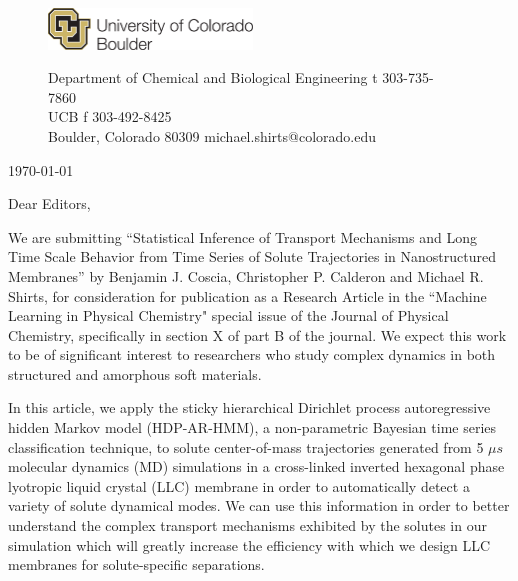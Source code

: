 \documentclass[fontsize=11pt]{article}
\begin{document}
	\graphicspath{{./figures/}}

	\begin{figure}
	\centering
	\begin{minipage}{0.37\textwidth}
	\includegraphics[width=2.14in,left]{CUBoulder.pdf}
	\end{minipage}
	\begin{minipage}{0.62\textwidth}
	\scriptsize
	\noindent Department of Chemical and Biological Engineering \hfill t 303-735-7860~~~~~~~~~~~~~~~~~~ \\
	 UCB \hfill f 303-492-8425~~~~~~~~~~~~~~~~~~ \\
	\noindent Boulder, Colorado 80309 \hfill michael.shirts@colorado.edu \\
	\end{minipage}
	\end{figure}
	
	\noindent \today

	\noindent Dear Editors,\\
	
	\newcommand{\ManuscriptTitle}{Statistical Inference of Transport Mechanisms and
	Long Time Scale Behavior from Time Series of Solute Trajectories in 
	Nanostructured Membranes}
	
	We are submitting ``\ManuscriptTitle'' by Benjamin J. Coscia, Christopher P.
	Calderon and Michael R. Shirts, for	consideration for publication as a Research
	Article in the ``Machine Learning in Physical Chemistry" special issue of the Journal 
	of Physical Chemistry, specifically in section X of %
	part B of the journal. We expect this work to be of significant interest to 
	researchers who study complex dynamics in both structured and amorphous soft 
	materials. %
	
	In this article, we apply the sticky hierarchical Dirichlet process autoregressive
	hidden Markov model (HDP-AR-HMM), a non-parametric Bayesian time series
	classification technique, to solute center-of-mass trajectories generated from
	5 $\mu s$ molecular dynamics (MD) simulations in a cross-linked inverted hexagonal
	phase lyotropic liquid crystal (LLC) membrane in order to automatically detect a
	variety of solute dynamical modes. We can use this information in order to 
	better understand the complex transport mechanisms exhibited by the solutes in 
	our simulation which will greatly increase the efficiency with which we 
	design LLC membranes for solute-specific separations.
	
\end{document}
